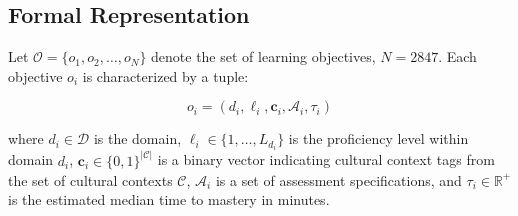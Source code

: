 \subsection{Formal Representation}

Let $\mathcal{O} = \{o_1, o_2, \ldots, o_N\}$ denote the set of learning objectives, $N = 2847$.
Each objective $o_i$ is characterized by a tuple:

\begin{equation}
    o_i = (d_i, \ell_i, \mathbf{c}_i, \mathcal{A}_i, \tau_i)
\end{equation}

\noindent where $d_i \in \mathcal{D}$ is the domain, $\ell_i \in \{1, \ldots, L_{d_i}\}$ is the proficiency level within domain $d_i$, $\mathbf{c}_i \in \{0,1\}^{|\mathcal{C}|}$ is a binary vector indicating cultural context tags from the set of cultural contexts $\mathcal{C}$, $\mathcal{A}_i$ is a set of assessment specifications, and $\tau_i \in \mathbb{R}^+$ is the estimated median time to mastery in minutes.

